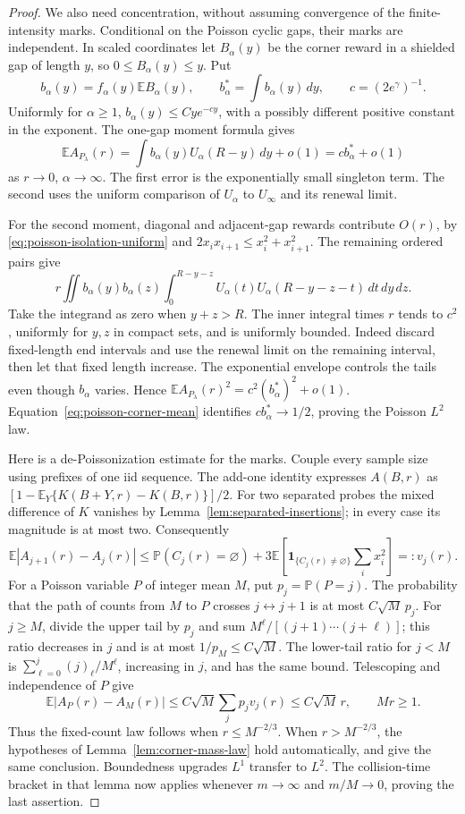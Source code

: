 \documentclass[11pt,letterpaper]{article}
\newcommand{\PP}{\mathbb P}\newcommand{\EE}{\mathbb E}
\newcommand{\ind}{\mathbf 1}\newcommand{\Exp}{\operatorname{Exp}}
\begin{document}
\begin{proof}
We also need concentration, without assuming convergence of the
finite-intensity marks. Conditional on the Poisson cyclic gaps, their
marks are independent. In scaled coordinates let $B_\alpha(y)$ be
the corner reward in a shielded gap of length $y$, so
$0\le B_\alpha(y)\le y$. Put
\[
 b_\alpha(y)=f_\alpha(y)\EE B_\alpha(y),\qquad
 b_\alpha^* =\int b_\alpha(y)\,dy,\qquad c=(2e^\gamma)^{-1}.
\]
Uniformly for $\alpha\ge1$, $b_\alpha(y)\le Cy e^{-cy}$,
with a possibly different positive constant in the exponent.
The one-gap moment formula gives
\[
 \EE A_{P_\lambda}(r)
   =\int b_\alpha(y)U_\alpha(R-y)\,dy+o(1)
   =c b_\alpha^*+o(1)
\]
as $r\to0$, $\alpha\to\infty$. The first error is the exponentially
small singleton term. The second uses the uniform comparison of
$U_\alpha$ to $U_\infty$ and its renewal limit.

For the second moment, diagonal and adjacent-gap rewards contribute
$O(r)$, by \eqref{eq:poisson-isolation-uniform} and
$2x_ix_{i+1}\le x_i^2+x_{i+1}^2$. The remaining ordered pairs give
\[
 r\iint b_\alpha(y)b_\alpha(z)
      \int_0^{R-y-z}U_\alpha(t)U_\alpha(R-y-z-t)\,dt\,dy\,dz.
\]
Take the integrand as zero when $y+z>R$. The inner integral times
$r$ tends to $c^2$, uniformly for $y,z$ in compact sets, and is
uniformly bounded. Indeed discard fixed-length end intervals and
use the renewal limit on the remaining interval, then let that fixed
length increase. The exponential envelope controls the tails even
though $b_\alpha$ varies. Hence
$\EE A_{P_\lambda}(r)^2=c^2(b_\alpha^*)^2+o(1)$.
Equation~\eqref{eq:poisson-corner-mean} identifies
$cb_\alpha^*\to1/2$, proving the Poisson $L^2$ law.

Here is a de-Poissonization estimate for the marks. Couple every
sample size using prefixes of one iid sequence. The add-one identity
expresses $A(B,r)$ as
$[1-\EE_Y\{K(B+Y,r)-K(B,r)\}]/2$.
For two separated probes the mixed difference of $K$ vanishes by
Lemma~\ref{lem:separated-insertions}; in every case its magnitude is
at most two. Consequently
\[
 \EE|A_{j+1}(r)-A_j(r)|\le
 \PP(C_j(r)=\varnothing)+3\EE\!\left[
      \ind_{\{C_j(r)\ne\varnothing\}}\sum_i x_i^2\right]=:v_j(r).
\]
For a Poisson variable $P$ of integer mean $M$, put $p_j=\PP(P=j)$.
The probability that the path of counts from $M$ to $P$ crosses
$j\leftrightarrow j+1$ is at most $C\sqrt M\,p_j$.
For $j\ge M$, divide the upper tail by $p_j$ and sum
$M^\ell/[(j+1)\cdots(j+\ell)]$; this ratio decreases in $j$ and
is at most $1/p_M\le C\sqrt M$. The lower-tail ratio for $j<M$
is $\sum_{\ell=0}^j(j)_\ell/M^\ell$, increasing in $j$, and has
the same bound. Telescoping and independence of $P$ give
\begin{equation}\label{eq:corner-depoissonization}
 \EE|A_P(r)-A_M(r)|
 \le C\sqrt M\sum_jp_jv_j(r)\le C\sqrt M\,r,
 \qquad Mr\ge1.
\end{equation}
Thus the fixed-count law follows when $r\le M^{-2/3}$.
When $r>M^{-2/3}$, the hypotheses of
Lemma~\ref{lem:corner-mass-law} hold automatically, and give the
same conclusion. Boundedness upgrades $L^1$ transfer to $L^2$.
The collision-time bracket in that lemma now applies whenever
$m\to\infty$ and $m/M\to0$, proving the last assertion.
\end{proof}
\end{document}
